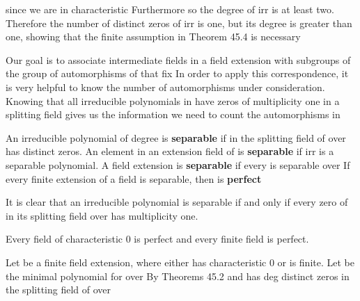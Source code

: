 \documentclass[11pt,oneside]{article}
\begin{document}
\BookNarrativetrue

\begin{BookBody}

\noindent since we are in characteristic  Furthermore so the degree of irr is at least two. Therefore the number of distinct zeros of irr is one, but its degree is greater than one, showing that the finite assumption in Theorem 45.4 is necessary\BookEnd{\blacktriangle}


\noindent Our goal is to associate intermediate fields in a field extension  with subgroups of the group of automorphisms of  that fix  In order to apply this correspondence, it is very helpful to know the number of automorphisms under consideration. Knowing that all irreducible polynomials in  have zeros of multiplicity one in a splitting field  gives us the information we need to count the automorphisms in 

 An irreducible polynomial  of degree  is\textbf{ separable} if in the splitting field  of  over  has  distinct zeros. An element \BookInline{\alpha } in an extension field of  is \textbf{separable} if irr is a separable polynomial. A field extension  is\textbf{ separable} if every  is separable over  If every finite extension of a field  is separable, then  is\textbf{ perfect}\BookEnd{\blacksquare}

It is clear that an irreducible polynomial  is separable if and only if every zero of  in its splitting field over  has multiplicity one.

 Every field of characteristic 0 is perfect and every finite field is perfect.

 Let  be a finite field extension, where either  has characteristic 0 or  is finite. Let  be the minimal polynomial for  over  By Theorems 45.2 and  has deg distinct zeros in the splitting field of  over \BookEnd{\blacklozenge}


\end{BookBody}
\end{document}

